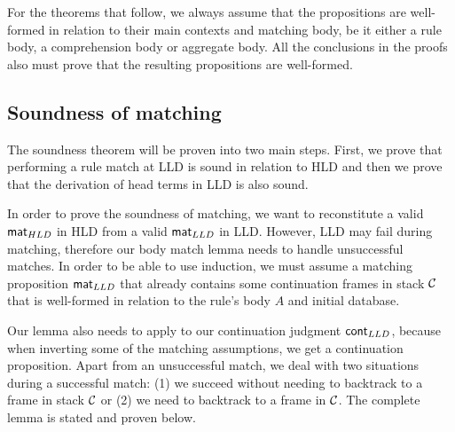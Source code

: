 For the theorems that follow, we always assume that the propositions are
well-formed in relation to their main contexts and matching body, be it either a
rule body, a comprehension body or aggregate body. All the conclusions in the
proofs also must prove that the resulting propositions are well-formed.

\subsection{Soundness of matching}

The soundness theorem will be proven into two main steps. First, we prove that
performing a rule match at LLD is sound in relation to HLD and then we prove
that the derivation of head terms in LLD is also sound.

In order to prove the soundness of matching, we want to reconstitute a valid
$\mathsf{mat}_{HLD} \;$in HLD from a valid $\mathsf{mat}_{LLD} \;$in LLD. However, LLD may fail during matching,
therefore our body match lemma needs to handle unsuccessful matches. In order to
be able to use induction, we must assume a matching proposition $\mathsf{mat}_{LLD} \;$that
already contains some continuation frames in stack $\mathcal{C}$ that is
well-formed in relation to the rule's body $A$ and initial database.

Our lemma also needs to apply to our continuation judgment $\mathsf{cont}_{LLD}$, because
when inverting some of the matching assumptions, we get a continuation
proposition. Apart from an unsuccessful match, we deal with two situations
during a successful match: (1) we succeed without needing to backtrack to a
frame in stack $\mathcal{C}$ or (2) we need to backtrack to a frame in
$\mathcal{C}$. The complete lemma is stated and proven below.

